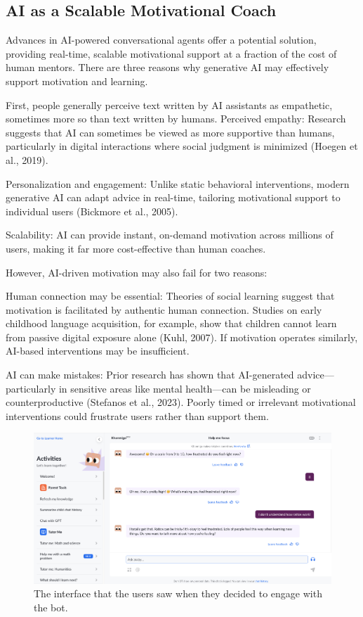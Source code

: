 \documentclass[11pt]{report}
\begin{document}
\begin{mainf}
\subsection{AI as a Scalable Motivational Coach}
Advances in AI-powered conversational agents offer a potential solution, providing real-time, scalable motivational support at a fraction of the cost of human mentors. 
There are three reasons why generative AI may effectively support motivation and learning.

First, people generally perceive text written by AI assistants as empathetic, sometimes more so than text written by humans. 
Perceived empathy: Research suggests that AI can sometimes be viewed as more supportive than humans, particularly in digital interactions where social judgment is minimized (Hoegen et al., 2019).

Personalization and engagement: Unlike static behavioral interventions, modern generative AI can adapt advice in real-time, tailoring motivational support to individual users (Bickmore et al., 2005).

Scalability: AI can provide instant, on-demand motivation across millions of users, making it far more cost-effective than human coaches.

However, AI-driven motivation may also fail for two reasons:

Human connection may be essential: Theories of social learning suggest that motivation is facilitated by authentic human connection. 
Studies on early childhood language acquisition, for example, show that children cannot learn from passive digital exposure alone (Kuhl, 2007). 
If motivation operates similarly, AI-based interventions may be insufficient.

AI can make mistakes: Prior research has shown that AI-generated advice—particularly in sensitive areas like mental health—can be misleading or counterproductive (Stefanos et al., 2023). 
Poorly timed or irrelevant motivational interventions could frustrate users rather than support them.

\begin{figure}[ht]
    \centering
    \includegraphics[width=0.95\linewidth]{interface.png}
    \caption{The interface that the users saw when they decided to engage with the bot.}
    \label{fig:interface}
\end{figure}


\end{mainf}
\end{document}
